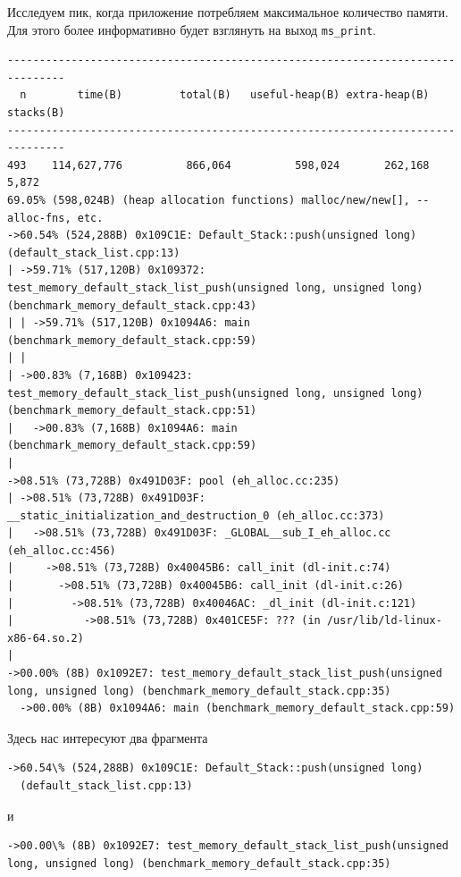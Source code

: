 Исследуем пик, когда приложение потребляем максимальное количество памяти. Для этого более информативно будет взглянуть на выход \texttt{ms_print}. 
\begin{lstlisting}[caption={}, label={}, style=style_code_block]
-------------------------------------------------------------------------------
  n        time(B)         total(B)   useful-heap(B) extra-heap(B)   stacks(B)
-------------------------------------------------------------------------------
493    114,627,776          866,064          598,024       262,168        5,872
69.05% (598,024B) (heap allocation functions) malloc/new/new[], --alloc-fns, etc.
->60.54% (524,288B) 0x109C1E: Default_Stack::push(unsigned long) (default_stack_list.cpp:13)
| ->59.71% (517,120B) 0x109372: test_memory_default_stack_list_push(unsigned long, unsigned long) (benchmark_memory_default_stack.cpp:43)
| | ->59.71% (517,120B) 0x1094A6: main (benchmark_memory_default_stack.cpp:59)
| |   
| ->00.83% (7,168B) 0x109423: test_memory_default_stack_list_push(unsigned long, unsigned long) (benchmark_memory_default_stack.cpp:51)
|   ->00.83% (7,168B) 0x1094A6: main (benchmark_memory_default_stack.cpp:59)
|     
->08.51% (73,728B) 0x491D03F: pool (eh_alloc.cc:235)
| ->08.51% (73,728B) 0x491D03F: __static_initialization_and_destruction_0 (eh_alloc.cc:373)
|   ->08.51% (73,728B) 0x491D03F: _GLOBAL__sub_I_eh_alloc.cc (eh_alloc.cc:456)
|     ->08.51% (73,728B) 0x40045B6: call_init (dl-init.c:74)
|       ->08.51% (73,728B) 0x40045B6: call_init (dl-init.c:26)
|         ->08.51% (73,728B) 0x40046AC: _dl_init (dl-init.c:121)
|           ->08.51% (73,728B) 0x401CE5F: ??? (in /usr/lib/ld-linux-x86-64.so.2)
|             
->00.00% (8B) 0x1092E7: test_memory_default_stack_list_push(unsigned long, unsigned long) (benchmark_memory_default_stack.cpp:35)
  ->00.00% (8B) 0x1094A6: main (benchmark_memory_default_stack.cpp:59)
\end{lstlisting}

Здесь нас интересуют два фрагмента 
\begin{lstlisting}[caption={}, label={}, style=style_code_block]
  ->60.54\% (524,288B) 0x109C1E: Default_Stack::push(unsigned long) 
  (default_stack_list.cpp:13)
\end{lstlisting}
и
\begin{lstlisting}[caption={}, label={}, style=style_code_block]
  ->00.00\% (8B) 0x1092E7: test_memory_default_stack_list_push(unsigned long, unsigned long) (benchmark_memory_default_stack.cpp:35)
\end{lstlisting}

